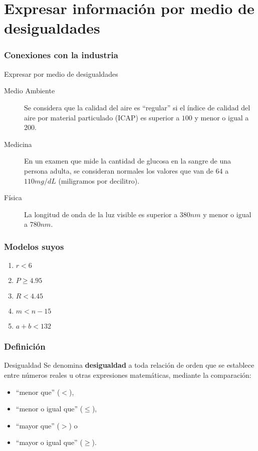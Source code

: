 \documentclass[12pt,spanish,x11names]{beamer}
\title{\talktitle}
\subtitle{\talksubtitle}
\author{\talkauthor}
\institute{\talkaffiliation}
\date{\footnotesize{\emph{\href{\talkblog}{\talkemail}}}}
\begin{document}
\begin{frame}
\titlepage
\end{frame}
\section{Expresar información por medio de desigualdades}
\begin{frame}
  \frametitle{Conexiones con la industria}
  \begin{exampleblock}{Expresar por medio de desigualdades}
    \begin{description}
    \item[Medio Ambiente] Se considera que la calidad del aire es ``regular'' si el índice de
      calidad del aire por material particulado (ICAP) es superior a $100$ y
      menor o igual a $200$.
    \item[Medicina] En un examen que mide la cantidad de glucosa en la sangre de
      una persona adulta, se consideran normales los valores que van de $64$ a
      $110 mg/dL$ (miligramos por decilitro).
    \item[Física] La longitud de onda
      de la luz visible es superior a $380 nm$ y menor o igual a $780 nm$.
    \end{description}
  \end{exampleblock}
\end{frame}
\begin{frame}
  \frametitle{Modelos suyos}
  \begin{exampleblock}{}
    \begin{enumerate}
    \item $r<6$
    \item $P\geq 4.95$
    \item $R<4.45$
    \item $m<n-15$
    \item $a+b<132$
    \end{enumerate}
  \end{exampleblock}
\end{frame}
\begin{frame}
  \frametitle{Definición}
  \begin{block}{Desigualdad}
    Se denomina \textbf{desigualdad} a toda relación de orden que se establece entre números reales u otras
    expresiones matemáticas, mediante la comparación:
    \begin{itemize}
    \item ``menor que'' ($<$),
    \item ``menor o igual que'' ($\leq$),
    \item ``mayor que'' ($>$) o
    \item ``mayor o igual que'' ($\geq$).
    \end{itemize}
  \end{block}
\end{frame}
\end{document}
